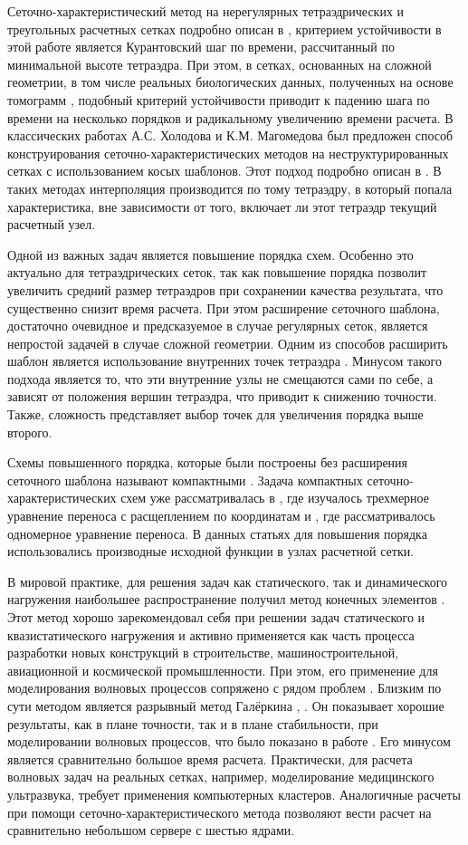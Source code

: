 \documentclass[14pt]{article}
\begin{document}
Сеточно-характеристический метод на нерегулярных тетраэдрических и треугольных расчетных сетках подробно описан в \cite{4}, критерием устойчивости в этой работе является Курантовский шаг по времени, рассчитанный по минимальной высоте тетраэдра.
При этом, в сетках, основанных на сложной геометрии, в том числе реальных биологических данных, полученных на основе томограмм \cite{5}, подобный критерий устойчивости приводит к падению шага по времени на несколько порядков и радикальному увеличению времени расчета.
В классических работах А.С. Холодова и К.М. Магомедова был предложен способ конструирования сеточно-характеристических методов на неструктурированных сетках с использованием косых шаблонов.
Этот подход подробно описан в \cite{6}.
В таких методах интерполяция производится по тому тетраэдру, в который попала характеристика, вне зависимости от того, включает ли этот тетраэдр текущий расчетный узел.

Одной из важных задач является повышение порядка схем. 
Особенно это актуально для тетраэдрических сеток, так как повышение порядка позволит увеличить средний размер тетраэдров при сохранении качества результата, что существенно снизит время расчета.
При этом расширение сеточного шаблона, достаточно очевидное и предсказуемое в случае регулярных сеток, является непростой задачей в случае сложной геометрии. 
Одним из способов расширить шаблон является использование внутренних точек тетраэдра \cite{7}.
Минусом такого подхода является то, что эти внутренние узлы не смещаются сами по себе, а зависят от положения вершин тетраэдра, что приводит к снижению точности.
Также, сложность представляет выбор точек для увеличения порядка выше второго.

Схемы повышенного порядка, которые были построены без расширения сеточного шаблона называют компактными \cite{8}. 
Задача  компактных сеточно-характеристических схем уже рассматривалась в \cite{9}, где изучалось трехмерное уравнение переноса с расщеплением по координатам и \cite{10}, где рассматривалось одномерное уравнение переноса. 
В данных статьях для повышения порядка использовались производные исходной функции в узлах расчетной сетки. 

В мировой практике, для решения задач как статического, так и динамического нагружения наибольшее распространение получил метод конечных элементов \cite{11}. 
Этот метод хорошо зарекомендовал себя при решении задач статического и квазистатического нагружения и активно применяется как часть процесса разработки новых конструкций в строительстве, машиностроительной, авиационной и космической промышленности.
При этом, его применение для моделирования волновых процессов сопряжено с рядом проблем \cite{12}.
Близким по сути методом является разрывный метод Галёркина \cite{13}, \cite{14}.
Он показывает хорошие результаты, как в плане точности, так и в плане стабильности, при моделировании волновых процессов, что было показано в работе \cite{15}.
Его минусом является сравнительно большое время расчета.
Практически, для расчета волновых задач на реальных сетках, например, моделирование медицинского ультразвука, требует применения компьютерных кластеров.
Аналогичные расчеты при помощи сеточно-характеристического метода позволяют вести расчет на сравнительно небольшом сервере с шестью ядрами.
\end{document}
